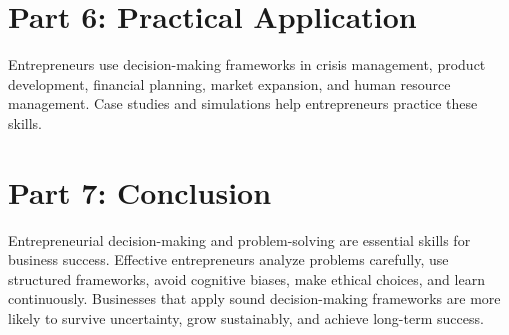 \documentclass[12pt,a4paper]{article}
\begin{document}
\section*{Part 6: Practical Application}
Entrepreneurs use decision-making frameworks in crisis management, product development, financial planning, market expansion, and human resource management. Case studies and simulations help entrepreneurs practice these skills.

\section*{Part 7: Conclusion}
Entrepreneurial decision-making and problem-solving are essential skills for business success. Effective entrepreneurs analyze problems carefully, use structured frameworks, avoid cognitive biases, make ethical choices, and learn continuously. Businesses that apply sound decision-making frameworks are more likely to survive uncertainty, grow sustainably, and achieve long-term success.
\end{document}
